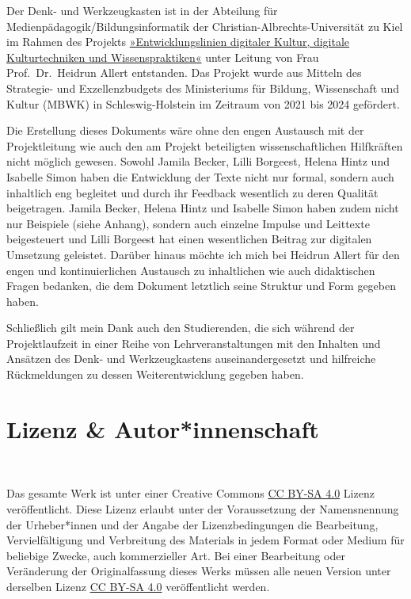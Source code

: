 \documentclass[
  a4paper,
]{book}
\begin{document}
Der Denk- und Werkzeugkasten ist in der Abteilung für Medienpädagogik/Bildungsinformatik der Christian-Albrechts-Universität zu Kiel im Rahmen des Projekts \href{https://www.medienpaedagogik.uni-kiel.de/de/profil/entwicklungslinien-digitaler-kultur-digitale-kulturtechniken-und-wissenspraktiken}{»Entwicklungslinien digitaler Kultur, digitale Kulturtechniken und Wissenspraktiken«} unter Leitung von Frau Prof.~Dr.~Heidrun Allert entstanden. Das Projekt wurde aus Mitteln des Strategie- und Exzellenzbudgets des Ministeriums für Bildung, Wissenschaft und Kultur (MBWK) in Schleswig-Holstein im Zeitraum von 2021 bis 2024 gefördert.

Die Erstellung dieses Dokuments wäre ohne den engen Austausch mit der Projektleitung wie auch den am Projekt beteiligten wissenschaftlichen Hilfkräften nicht möglich gewesen. Sowohl Jamila Becker, Lilli Borgeest, Helena Hintz und Isabelle Simon haben die Entwicklung der Texte nicht nur formal, sondern auch inhaltlich eng begleitet und durch ihr Feedback wesentlich zu deren Qualität beigetragen. Jamila Becker, Helena Hintz und Isabelle Simon haben zudem nicht nur Beispiele (siehe Anhang), sondern auch einzelne Impulse und Leittexte beigesteuert und Lilli Borgeest hat einen wesentlichen Beitrag zur digitalen Umsetzung geleistet. Darüber hinaus möchte ich mich bei Heidrun Allert für den engen und kontinuierlichen Austausch zu inhaltlichen wie auch didaktischen Fragen bedanken, die dem Dokument letztlich seine Struktur und Form gegeben haben.

Schließlich gilt mein Dank auch den Studierenden, die sich während der Projektlaufzeit in einer Reihe von Lehrveranstaltungen mit den Inhalten und Ansätzen des Denk- und Werkzeugkastens auseinandergesetzt und hilfreiche Rückmeldungen zu dessen Weiterentwicklung gegeben haben.

\section{Lizenz \& Autor*innenschaft}\label{lizenz-autorinnenschaft}

~

Das gesamte Werk ist unter einer Creative Commons \href{https://creativecommons.org/licenses/by-sa/4.0/}{CC BY-SA 4.0} Lizenz veröffentlicht. Diese Lizenz erlaubt unter der Voraussetzung der Namensnennung der Urheber*innen und der Angabe der Lizenzbedingungen die Bearbeitung, Vervielfältigung und Verbreitung des Materials in jedem Format oder Medium für beliebige Zwecke, auch kommerzieller Art. Bei einer Bearbeitung oder Veränderung der Originalfassung dieses Werks müssen alle neuen Version unter derselben Lizenz \href{https://creativecommons.org/licenses/by-sa/4.0/}{CC BY-SA 4.0} veröffentlicht werden.
\end{document}
